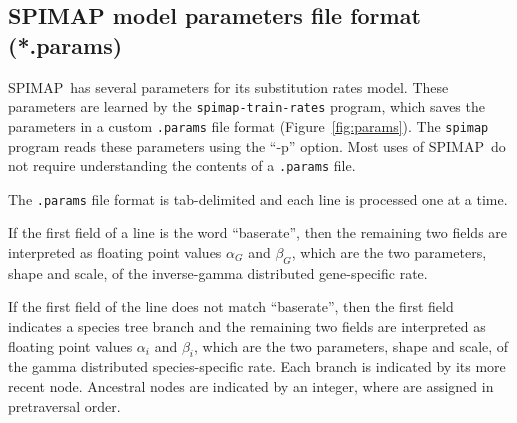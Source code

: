 \documentclass[11pt]{article}
\newcommand{\figref}[1]{Figure~\ref{#1}}
\newcommand{\spimap}{{\sf\scshape SPIMAP}}
\begin{document}
\subsection{SPIMAP model parameters file format (*.params)}
\label{sec:file:params}

\spimap\ has several parameters for its substitution rates model.
These parameters are learned by the {\tt spimap-train-rates} program,
which saves the parameters in a custom {\tt *.params} file format
(\figref{fig:params}).  The {\tt spimap} program reads these
parameters using the ``-p'' option.  Most uses of \spimap\ do not
require understanding the contents of a {\tt *.params} file.

The {\tt *.params} file format is tab-delimited and each line is
processed one at a time.

If the first field of a line is the word ``baserate'', then the
remaining two fields are interpreted as floating point values
$\alpha_G$ and $\beta_G$, which are the two parameters, shape and
scale, of the inverse-gamma distributed gene-specific rate.  

If the first field of the line does not match ``baserate'', then the first
field indicates a species tree branch and the remaining two fields
are interpreted as floating point values $\alpha_i$ and $\beta_i$,
which are the two parameters, shape and scale, of the gamma distributed
species-specific rate.  Each branch is indicated by its more recent node.
Ancestral nodes are indicated by an integer, where are assigned in 
pretraversal order.
\end{document}
